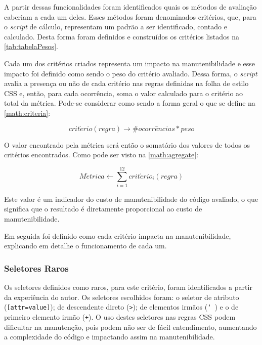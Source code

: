 

A partir dessas funcionalidades foram identificados quais os métodos de avaliação caberiam a cada um deles. Esses métodos foram denominados critérios, que, para o \textit{script} de cálculo, representam um padrão a ser identificado, contado e calculado. Desta forma foram definidos e construídos os critérios listados na \autoref{tab:tabelaPesos}.

Cada um dos critérios criados representa um impacto na manutenibilidade e esse impacto foi definido como sendo o peso do critério avaliado. Dessa forma, o \textit{script} avalia a presença ou não de cada critério nas regras definidas na folha de estilo CSS e, então, para cada ocorrência, soma o valor calculado para o critério ao total da métrica. Pode-se considerar como sendo a forma geral o que se define na \autoref{math:criteria}:

\begin{equation}
\label{math:criteria}
	crit\acute{e}rio(regra) \rightarrow \# ocorr\hat{e}ncias * peso
\end{equation}

O valor encontrado pela métrica será então o somatório dos valores de todos os critérios encontrados. Como pode ser visto na \autoref{math:agregate}:

\begin{equation}
\label{math:agregate}
	M\acute{e}trica \leftarrow \displaystyle\sum_{i=1}^{12} crit\acute{e}rio_i(regra)
\end{equation}

Este valor é um indicador do custo de manutenibilidade do código avaliado, o que significa que o resultado é diretamente proporcional ao custo de manutenibilidade.

Em seguida foi definido como cada critério impacta na manutenibilidade, explicando em detalhe o funcionamento de cada um.

\subsubsection{Seletores Raros}
Os seletores definidos como raros, para este critério, foram identificados a partir da experiência do autor. Os seletores escolhidos foram: o seletor de atributo (\texttt{[attr=value]}); de descendente direto (\texttt{>}); de elementos irmãos (\texttt{\char`~}) e o de primeiro elemento irmão (\texttt{+}). O uso destes seletores nas regras CSS podem dificultar na manutenção, pois podem não ser de fácil entendimento, aumentando a complexidade do código e impactando assim na manutenibilidade.

